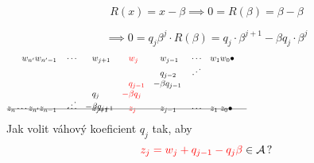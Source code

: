 \documentclass[11pt]{beamer}
\begin{document}
\begin{frame}
    $$R(x)= x-\beta \implies 0=R(\beta)=\beta -\beta$$%
    
    $$\implies 0=q_j \beta^j \cdot R(\beta) =q_j\cdot \beta^{j+1} -\beta  q_j \cdot \beta^{j}$$
    \begin{align*}
        w_{n'} w_{n'-1}&&&\cdots& &w_{j+1}&\!\! &\textcolor{red}{w_j}  & \!\!  &w_{j-1} &&\cdots &&w_1 w_0\bullet \hspace{200pt}\\[-5pt]
                   &&&&       &       & &     &   &q_{j-2} &&\iddots\\[-3pt] 
                   &&&&       &       & &\textcolor{red}{q_{j-1}}& -&\beta q_{j-1} \\[-3pt]
                   &&&&         &q_j&   \textcolor{red}{-}&\textcolor{red}{\beta q_j} &&\\[-8pt]
                   &&&  \iddots      &   -&\beta q_{j+1}&   &\ &&\\[-17pt]
    \intertext{\line(1,0){280}}
    \vspace{-15pt}
    \\[-30pt]
     z_{n} \cdots z_{n'} z_{n-1}&&&\cdots& &z_{j+1}& &\textcolor{red}{z_j}& &z_{j-1} &&\cdots &&z_1 \; z_0\bullet                            
    \end{align*}
    \pause
    Jak volit váhový koeficient $q_j$ tak, aby
    $$
        \textcolor{red}{z_j=w_j + q_{j-1} - q_j \beta} \in \mathcal{A}\,?
    $$
        
\end{frame}
\end{document}
